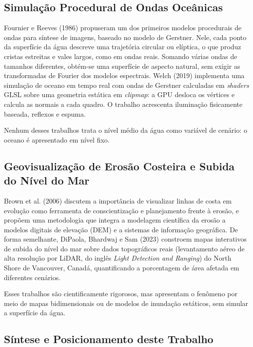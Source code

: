 \documentclass[conference]{IEEEtran}
\begin{document}
\subsection{Simulação Procedural de Ondas Oceânicas}
\label{sub:ondas-rel}

Fournier e Reeves (1986) propuseram um dos primeiros modelos procedurais de
ondas para síntese de imagens, baseado no modelo de Gerstner. Nele, cada
ponto da superfície da água descreve uma trajetória circular ou elíptica, o
que produz cristas estreitas e vales largos, como em ondas reais. Somando
várias ondas de tamanhos diferentes, obtém-se uma superfície de aspecto
natural, sem exigir as transformadas de Fourier dos modelos espectrais. Welch (2019)
implementa uma simulação de oceano em tempo real com ondas de Gerstner
calculadas em \emph{shaders} GLSL sobre uma geometria estática em
\emph{clipmap}: a GPU desloca os vértices e calcula as normais a cada quadro.
O trabalho acrescenta iluminação fisicamente baseada, reflexos e espuma.

Nenhum desses trabalhos trata o nível médio da água como variável de
cenário: o oceano é apresentado em nível fixo.

\subsection{Geovisualização de Erosão Costeira e Subida do Nível do Mar}
\label{sub:geovis}

Brown et al. (2006) discutem a importância de visualizar linhas de costa em
evolução como ferramenta de conscientização e planejamento frente à erosão,
e propõem uma metodologia que integra a modelagem científica da erosão a
modelos digitais de elevação (DEM) e a sistemas de informação geográfica.
De forma semelhante, DiPaola, Bhardwaj e Sam (2023) constroem mapas
interativos de subida do nível do mar sobre dados topográficos reais
(levantamento aéreo de alta resolução por LiDAR, do inglês \emph{Light
Detection and Ranging}) do North Shore de Vancouver, Canadá,
quantificando a porcentagem de área afetada em diferentes cenários.

Esses trabalhos são cientificamente rigorosos, mas apresentam o fenômeno por
meio de mapas bidimensionais ou de modelos de inundação estáticos, sem
simular a superfície da água.

\subsection{Síntese e Posicionamento deste Trabalho}
\label{sub:sintese}
\end{document}
